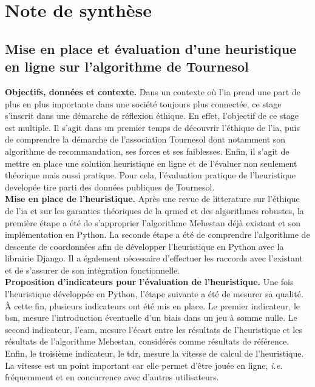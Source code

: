 \section*{Note de synthèse}
\subsection*{Mise en place et évaluation d'une heuristique en ligne sur l'algorithme de Tournesol}

\textbf{Objectifs, données et contexte.} Dans un contexte où l'\acrfull{ia} prend une part de plus en plus importante dans une société toujours plus connectée, ce stage s'inscrit dans une démarche de réflexion éthique. En effet, l'objectif de ce stage est multiple. Il s'agit dans un premier temps de découvrir l'éthique de l'\gls{ia}, puis de comprendre la démarche de l'association Tournesol dont notamment son algorithme de recommandation, ses forces et ses faiblesses. Enfin, il s'agit de mettre en place une solution heuristique en ligne et de l'évaluer non seulement théorique mais aussi pratique. Pour cela, l'évaluation pratique de l'heuristique developée tire parti des données publiques de Tournesol. \\
\textbf{Mise en place de l'heuristique.} Après une revue de litterature sur l'éthique de l'\gls{ia} et sur les garanties théoriques de la \gls{qrmed} et des algorithmes robustes, la première étape a été de s'approprier l'algorithme Mehestan déjà existant et son implémentation en Python. La seconde étape a été de comprendre l'algorithme de descente de coordonnées afin de développer l'heuristique en Python avec la librairie Django. Il a également nécessaire d'effectuer les raccords avec l'existant et de s'assurer de son intégration fonctionnelle. \\
\textbf{Proposition d'indicateurs pour l'évaluation de l'heuristique.} Une fois l'heuristique développée en Python, l'étape suivante a été de mesurer sa qualité. À  cette fin, plusieurs indicateurs ont été mis en place. Le premier indicateur, le \gls{bsn}, mesure l'introduction éventuelle d'un biais dans un jeu à somme nulle. Le second indicateur, l'\gls{eam}, mesure l'écart entre les résultats de l'heuristique et les résultats de l'algorithme Mehestan, considérés comme résultats de référence. Enfin, le troisième indicateur, le \gls{tdr}, mesure la vitesse de calcul de l'heuristique. La vitesse est un point important car elle permet d'être jouée en ligne, \textit{i.e.} fréquemment et en concurrence avec d'autres utilisateurs. \\
